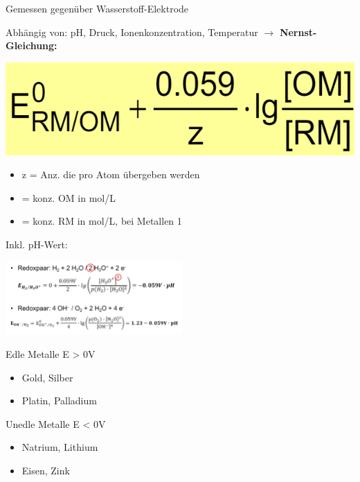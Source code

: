     Gemessen gegenüber Wasserstoff-Elektrode

    Abhängig von: pH, Druck, Ionenkonzentration, Temperatur $\to$ \textbf{Nernst-Gleichung:}

    


    \begin{minipage}{0.4\linewidth}
        \includegraphics[width=\linewidth]{pictures/Nernst.png}
    \end{minipage}
    \hfill
    \begin{minipage}{0.55\linewidth}
        \begin{itemize}
            \item z = Anz.  die pro Atom übergeben werden
            \item \ce{[OM]} = konz. OM in mol/L
            \item \ce{[RM]} = konz. RM in mol/L, bei Metallen 1
        \end{itemize}
    \end{minipage}


     \begin{minipage}{0.65\linewidth}
        Inkl. pH-Wert:

        \includegraphics[height=2.8cm]{pictures/Nernstph.png}
    \end{minipage}
    \hfill
    \begin{minipage}{0.3\linewidth}
        Edle Metalle E > 0V
        \begin{itemize}
            \item Gold, Silber
            \item Platin, Palladium
        \end{itemize}
        Unedle Metalle E < 0V
        \begin{itemize}
            \item Natrium, Lithium
            \item Eisen, Zink
        \end{itemize}
    \end{minipage}